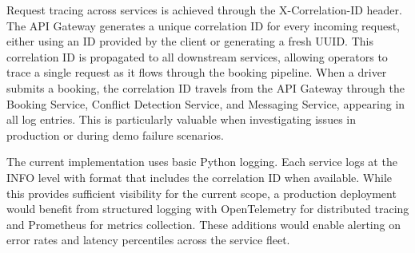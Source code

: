 \documentclass{article}
\begin{document}
Request tracing across services is achieved through the X-Correlation-ID header. The API Gateway generates a unique correlation ID for every incoming request, either using an ID provided by the client or generating a fresh UUID. This correlation ID is propagated to all downstream services, allowing operators to trace a single request as it flows through the booking pipeline. When a driver submits a booking, the correlation ID travels from the API Gateway through the Booking Service, Conflict Detection Service, and Messaging Service, appearing in all log entries. This is particularly valuable when investigating issues in production or during demo failure scenarios.

The current implementation uses basic Python logging. Each service logs at the INFO level with format that includes the correlation ID when available. While this provides sufficient visibility for the current scope, a production deployment would benefit from structured logging with OpenTelemetry for distributed tracing and Prometheus for metrics collection. These additions would enable alerting on error rates and latency percentiles across the service fleet.
\end{document}
